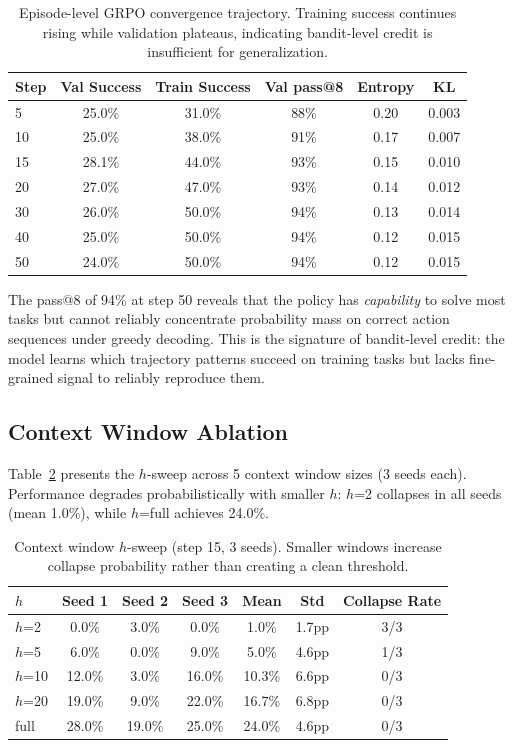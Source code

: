 \documentclass{article}
\begin{document}
\begin{table}[h]
\centering
\caption{Episode-level GRPO convergence trajectory. Training success continues rising while validation plateaus, indicating bandit-level credit is insufficient for generalization.}
\label{tab:convergence}
\begin{tabular}{lccccc}
\toprule
Step & Val Success & Train Success & Val pass@8 & Entropy & KL \\
\midrule
5 & 25.0\% & 31.0\% & 88\% & 0.20 & 0.003 \\
10 & 25.0\% & 38.0\% & 91\% & 0.17 & 0.007 \\
15 & 28.1\% & 44.0\% & 93\% & 0.15 & 0.010 \\
20 & 27.0\% & 47.0\% & 93\% & 0.14 & 0.012 \\
30 & 26.0\% & 50.0\% & 94\% & 0.13 & 0.014 \\
40 & 25.0\% & 50.0\% & 94\% & 0.12 & 0.015 \\
50 & 24.0\% & 50.0\% & 94\% & 0.12 & 0.015 \\
\bottomrule
\end{tabular}
\end{table}

The pass@8 of 94\% at step 50 reveals that the policy has \emph{capability} to solve most tasks but cannot reliably concentrate probability mass on correct action sequences under greedy decoding. This is the signature of bandit-level credit: the model learns which trajectory patterns succeed on training tasks but lacks fine-grained signal to reliably reproduce them.

\subsection{Context Window Ablation}
\label{sec:hsweep}

Table~\ref{tab:hsweep} presents the $h$-sweep across 5 context window sizes (3 seeds each). Performance degrades probabilistically with smaller $h$: $h$=2 collapses in all seeds (mean 1.0\%), while $h$=full achieves 24.0\%.

\begin{table}[h]
\centering
\caption{Context window $h$-sweep (step 15, 3 seeds). Smaller windows increase collapse probability rather than creating a clean threshold.}
\label{tab:hsweep}
\begin{tabular}{lcccccc}
\toprule
$h$ & Seed 1 & Seed 2 & Seed 3 & Mean & Std & Collapse Rate \\
\midrule
$h$=2 & 0.0\% & 3.0\% & 0.0\% & 1.0\% & 1.7pp & 3/3 \\
$h$=5 & 6.0\% & 0.0\% & 9.0\% & 5.0\% & 4.6pp & 1/3 \\
$h$=10 & 12.0\% & 3.0\% & 16.0\% & 10.3\% & 6.6pp & 0/3 \\
$h$=20 & 19.0\% & 9.0\% & 22.0\% & 16.7\% & 6.8pp & 0/3 \\
full & 28.0\% & 19.0\% & 25.0\% & 24.0\% & 4.6pp & 0/3 \\
\bottomrule
\end{tabular}
\end{table}
\end{document}
